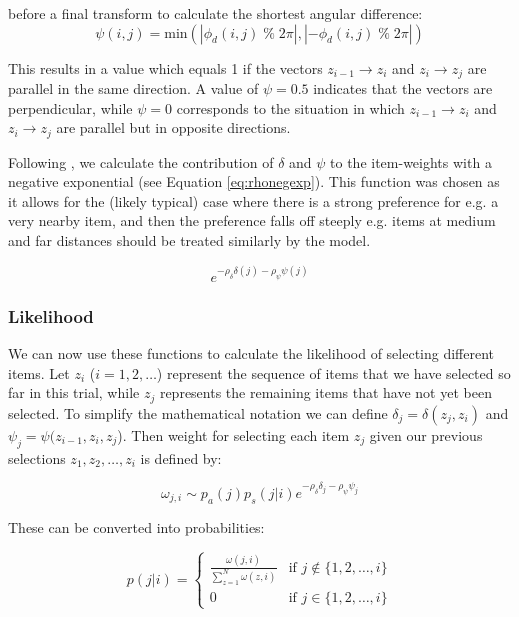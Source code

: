 \documentclass[man, floatsintext]{apa7}
\begin{document}
before a final transform to calculate the shortest angular difference:
\begin{equation}
\label{eq:psi}
    \psi(i, j) =  \text{min}(\left| \phi_d(i, j)\; \%\; 2\pi\right|, \left|-\phi_d(i, j)\; \%\; 2\pi\right|)
\end{equation}

This results in a value which equals 1 if the vectors $z_{i-1}\rightarrow z_i$ and  $z_{i}\rightarrow z_j$ are parallel in the same direction. A value of $\psi=0.5$ indicates that the vectors are perpendicular, while $\psi = 0$ corresponds to the situation in which $z_{i-1}\rightarrow z_i$ and $z_{i}\rightarrow z_j$ are parallel but in opposite directions.

Following \cite{clarke2022foraging}, we calculate the contribution of $\delta$ and $\psi$ to the item-weights with a negative exponential (see Equation \ref{eq:rhonegexp}). This function was chosen as it allows for the (likely typical) case where there is a strong preference for e.g. a very nearby item, and then the preference falls off steeply e.g. items at medium and far distances should be treated similarly by the model. 

\begin{equation}
\label{eq:rhonegexp}
e^{-\rho_{\delta} \delta(j) - \rho_{\psi} \psi(j)}   
\end{equation}

\subsubsection{Likelihood}

We can now use these functions to calculate the likelihood of selecting different items. Let $z_i$ ($i = 1, 2, \ldots$) represent the sequence of items that we have selected so far in this trial, while $z_j$ represents the remaining items that have not yet been selected. To simplify the mathematical notation we can define $\delta_j = \delta(z_j,z_i)$ and $\psi_j = \psi(z_{i-1}, z_i, z_j$). Then weight for selecting each item $z_j$ given our previous selections $z_1, z_2, \ldots, z_i$ is defined by: 

\begin{equation}
\label{eq:fomo_llh}
\omega_{j, i} \sim p_{a}(j) p_s(j| i) e^{-\rho_{\delta} \delta_j - \rho_{\psi} \psi_j}
\end{equation}

These can be converted into probabilities:

\begin{equation}
p(j| i) = 
\begin{cases}
\frac{\omega(j, i)} {\sum_{z=1}^N \omega(z, i)} & \text{if } j \notin \{1, 2, \ldots, i\} \\
0 & \text{if } j \in \{1, 2, \ldots, i\} 
\label{eq:condprob}
\end{cases}
\end{equation}
\end{document}
